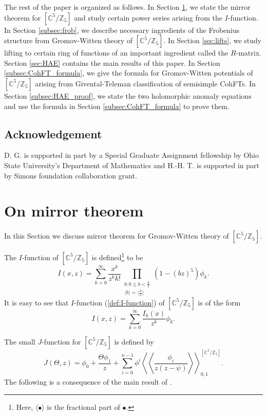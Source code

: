 \documentclass[12pt]{amsart}
\numberwithin{equation}{section}
\begin{document}
The rest of the paper is organized as follows. In Section \ref{sec:mirror_thm}, we state the mirror theorem for $[\mathbb{C}^5/\mathbb{Z}_5]$ and study certain power series arising from the $I$-function. In Section \ref{subsec:frob}, we describe necessary ingredients of the Frobenius structure from Gromov-Witten theory of $[\mathbb{C}^5/\mathbb{Z}_5]$. In Section \ref{sec:lifts}, we study lifting to certain ring of functions of an important ingredient called the $R$-matrix. Section \ref{sec:HAE} contains the main results of this paper. In Section \ref{subsec:CohFT_formula}, we give the formula for Gromov-Witten potentials of $[\mathbb{C}^5/\mathbb{Z}_5]$ arising from Givental-Teleman classification of semisimple CohFTs. In Section \ref{subsec:HAE_proof}, we state the two holomorphic anomaly equations and use the formula in Section \ref{subsec:CohFT_formula} to prove them. 

\subsection{Acknowledgement}
D. G. is supported in part by a Special Graduate Assignment fellowship by Ohio State University's Department of Mathematics and H.-H. T. is supported in part by Simons foundation collaboration grant. 

\section{On mirror theorem}\label{sec:mirror_thm}
In this Section we discuss mirror theorem for Gromov-Witten theory of $[\mathbb{C}^5/\mathbb{Z}_5]$.

The $I$-function of $\left[\mathbb{C}^{5} / \mathbb{Z}_{5}\right]$ is defined\footnote{Here, $\langle \bullet \rangle$ is the fractional part of $\bullet$.} to be 
\begin{equation}\label{def:I-function}
I\left(x, z\right)=
        \sum_{k=0}^{\infty}\frac{x^k}{{z^k}k!}\prod_{\substack{b:0\leq b<\frac{k}{5} \\ \langle b \rangle=\langle\frac{k}{5}\rangle}}\left(1-(bz)^5\right)\phi_k.
\end{equation}
It is easy to see that $I$-function (\ref{def:I-function}) of $[\mathbb{C}^5/\mathbb{Z}_5]$ is of the form
\begin{equation}\label{eq:IfuncAsSumIk}
I\left(x, z\right)=\sum_{k=0}^{\infty}\frac{I_k(x)}{z^k}\phi_k.
\end{equation}

The small $J$-function for $[\mathbb{C}^5/\mathbb{Z}_5]$ is defined by 
\begin{equation*}
J\left(\Theta,z\right)=\phi_0+\frac{\Theta\phi_1}{z}+\sum_{i=0}^{n-1}\phi^i\left\langle\left\langle\frac{\phi_i}{z(z-\psi)}\right\rangle\right\rangle_{0,1}^{[\mathbb{C}^5/\mathbb{Z}_5]}.
\end{equation*}
The following is a consequence of the main result of \cite{ccit}.
\end{document}
